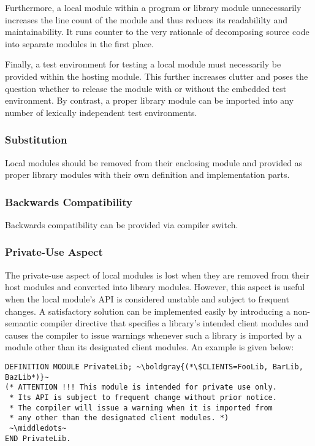 \documentclass[10pt,a4paper]{article}
\newcommand\boldgray[1]{\textcolor{gray}{\textbf{#1}}}
\newcommand\middledots{\textperiodcentered\textperiodcentered\textperiodcentered}
\begin{document}
Furthermore, a local module within a program or library module unnecessarily
increases the line count of the module and thus reduces its readabililty and
maintainability. It runs counter to the very rationale of decomposing source
code into separate modules in the first place.

Finally, a test environment for testing a local module must necessarily be
provided within the hosting module.  This further increases clutter and poses
the question whether to release the module with or without the embedded test
environment. By contrast, a proper library module can be imported into any
number of lexically independent test environments.

\subsubsection{Substitution}
Local modules should be removed from their enclosing module and provided as
proper library modules with their own definition and implementation parts.

\subsubsection{Backwards Compatibility}

Backwards compatibility can be provided via compiler switch.

\subsubsection{Private-Use Aspect}

The private-use aspect of local modules is lost when they are removed from
their host modules and converted into library modules. However, this aspect
is useful when the local module's API is considered unstable and subject to
frequent changes. A satisfactory solution can be implemented easily by
introducing a \gls{non-semantic compiler directive} that specifies a
library's intended client modules and causes the compiler to issue warnings
whenever such a library is imported by a module other than its designated
client modules. An example is given below:

\lstset{style=modula2}
\begin{lstlisting}[escapechar=~]
DEFINITION MODULE PrivateLib; ~\boldgray{(*\$CLIENTS=FooLib, BarLib, BazLib*)}~
(* ATTENTION !!! This module is intended for private use only.
 * Its API is subject to frequent change without prior notice.
 * The compiler will issue a warning when it is imported from
 * any other than the designated client modules. *)
 ~\middledots~
END PrivateLib.
\end{lstlisting}
\end{document}
